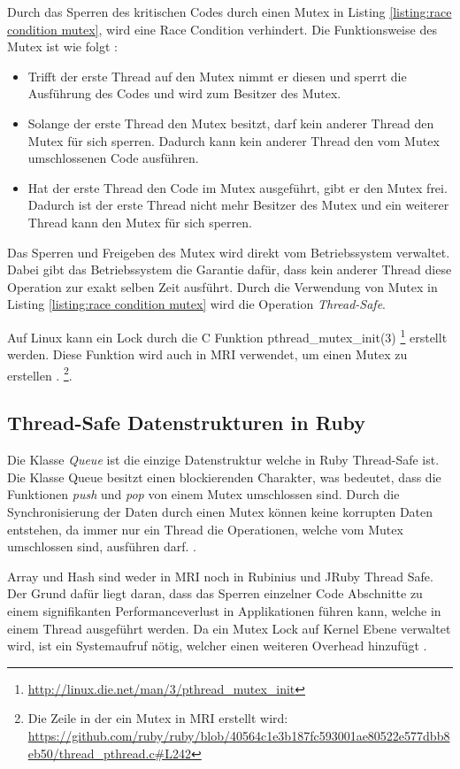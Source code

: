 Durch das Sperren des kritischen Codes durch einen Mutex in Listing \ref{listing:race condition mutex}, wird eine Race Condition verhindert. Die Funktionsweise des Mutex ist wie folgt \cite[p. 83-84]{Sto2013}: 

\begin{itemize}
  \item Trifft der erste Thread auf den Mutex nimmt er diesen und sperrt die Ausführung des Codes und wird zum Besitzer des Mutex.
  \item Solange der erste Thread den Mutex besitzt, darf kein anderer Thread den Mutex für sich sperren. Dadurch kann kein anderer Thread den vom Mutex umschlossenen Code ausführen. 
  \item Hat der erste Thread den Code im Mutex ausgeführt, gibt er den Mutex frei. Dadurch ist der erste Thread nicht mehr Besitzer des Mutex und ein weiterer Thread kann den Mutex für sich sperren.
\end{itemize}

Das Sperren und Freigeben des Mutex wird direkt vom Betriebssystem verwaltet. Dabei gibt das Betriebssystem die Garantie dafür, dass kein anderer Thread diese Operation zur exakt selben Zeit ausführt. Durch die Verwendung von Mutex in Listing \ref{listing:race condition mutex} wird die Operation \emph{Thread-Safe}.

Auf Linux kann ein Lock durch die C Funktion pthread\_mutex\_init(3) \footnote{\url{http://linux.die.net/man/3/pthread_mutex_init}} erstellt werden. Diese Funktion wird auch in MRI verwendet, um einen Mutex zu erstellen \cite[p. 83-84]{Sto2013}. \footnote{Die Zeile in der ein Mutex in MRI erstellt wird: \url{https://github.com/ruby/ruby/blob/40564c1e3b187fc593001ae80522e577dbb8eb50/thread_pthread.c#L242}}.

\subsection{Thread-Safe Datenstrukturen in Ruby}
Die Klasse \emph{Queue} ist die einzige Datenstruktur welche in Ruby Thread-Safe ist. Die Klasse Queue besitzt einen blockierenden Charakter, was bedeutet, dass die Funktionen \emph{push} und \emph{pop} von einem Mutex umschlossen sind. Durch die Synchronisierung der Daten durch einen Mutex können keine korrupten Daten entstehen, da immer nur ein Thread die Operationen, welche vom Mutex umschlossen sind, ausführen darf. \cite[p. 110]{Sto2013}. 

Array und Hash sind weder in MRI noch in Rubinius und JRuby Thread Safe. Der Grund dafür liegt daran, dass das Sperren einzelner Code Abschnitte zu einem signifikanten Performanceverlust in Applikationen führen kann, welche in einem Thread ausgeführt werden. Da ein Mutex Lock auf Kernel Ebene verwaltet wird, ist ein Systemaufruf nötig, welcher einen weiteren Overhead hinzufügt \cite[p. 110]{Sto2013}.

